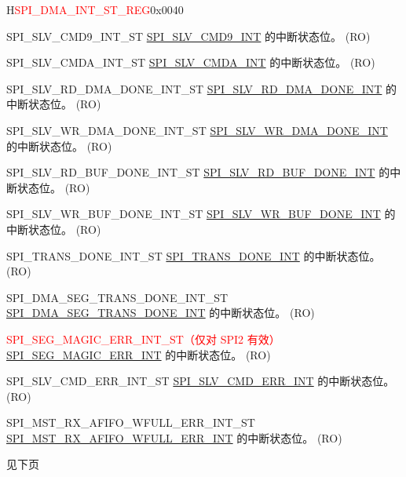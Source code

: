 \begin{register}{H}{\textcolor{red}{SPI\_DMA\_INT\_ST\_REG}}{0x{}0040}
\begin{regdesc}
\begin{reglist}
\label{fielddesc:SPISLVCMD9INTST}\item [SPI\_SLV\_CMD9\_INT\_ST] \hyperref[int:SPISLVCMD9INT]{SPI\_SLV\_CMD9\_INT} 的中断状态位。 (RO)
\label{fielddesc:SPISLVCMDAINTST}\item [SPI\_SLV\_CMDA\_INT\_ST] \hyperref[int:SPISLVCMDAINT]{SPI\_SLV\_CMDA\_INT} 的中断状态位。 (RO)
\label{fielddesc:SPISLVRDDMADONEINTST}\item [SPI\_SLV\_RD\_DMA\_DONE\_INT\_ST] \hyperref[int:SPISLVRDDMADONEINT]{SPI\_SLV\_RD\_DMA\_DONE\_INT} 的中断状态位。 (RO)
\label{fielddesc:SPISLVWRDMADONEINTST}\item [SPI\_SLV\_WR\_DMA\_DONE\_INT\_ST] \hyperref[int:SPISLVWRDMADONEINT]{SPI\_SLV\_WR\_DMA\_DONE\_INT} 的中断状态位。 (RO)
\label{fielddesc:SPISLVRDBUFDONEINTST}\item [SPI\_SLV\_RD\_BUF\_DONE\_INT\_ST] \hyperref[int:SPISLVRDBUFDONEINT]{SPI\_SLV\_RD\_BUF\_DONE\_INT} 的中断状态位。 (RO)
\label{fielddesc:SPISLVWRBUFDONEINTST}\item [SPI\_SLV\_WR\_BUF\_DONE\_INT\_ST] \hyperref[int:SPISLVWRBUFDONEINT]{SPI\_SLV\_WR\_BUF\_DONE\_INT} 的中断状态位。 (RO)
\label{fielddesc:SPITRANSDONEINTST}\item [SPI\_TRANS\_DONE\_INT\_ST] \hyperref[int:SPITRANSDONEINT]{SPI\_TRANS\_DONE\_INT} 的中断状态位。 (RO)
\label{fielddesc:SPIDMASEGTRANSDONEINTST}\item [SPI\_DMA\_SEG\_TRANS\_DONE\_INT\_ST] \hyperref[int:SPIDMASEGTRANSDONEINT]{SPI\_DMA\_SEG\_TRANS\_DONE\_INT} 的中断状态位。 (RO)
\label{fielddesc:SPISEGMAGICERRINTST}\item [\textcolor{red}{SPI\_SEG\_MAGIC\_ERR\_INT\_ST（仅对 SPI2 有效）}] \hyperref[int:SPISEGMAGICERRINT]{SPI\_SEG\_MAGIC\_ERR\_INT} 的中断状态位。 (RO)
\label{fielddesc:SPISLVCMDERRINTST}\item [SPI\_SLV\_CMD\_ERR\_INT\_ST] \hyperref[int:SPISLVCMDERRINT]{SPI\_SLV\_CMD\_ERR\_INT} 的中断状态位。 (RO)
\label{fielddesc:SPIMSTRXAFIFOWFULLERRINTST}\item [SPI\_MST\_RX\_AFIFO\_WFULL\_ERR\_INT\_ST] \hyperref[int:SPIMSTRXAFIFOWFULLERRINT]{SPI\_MST\_RX\_AFIFO\_WFULL\_ERR\_INT} 的中断状态位。 (RO)


\item [见下页]
\end{reglist}\end{regdesc}
\end{register}

